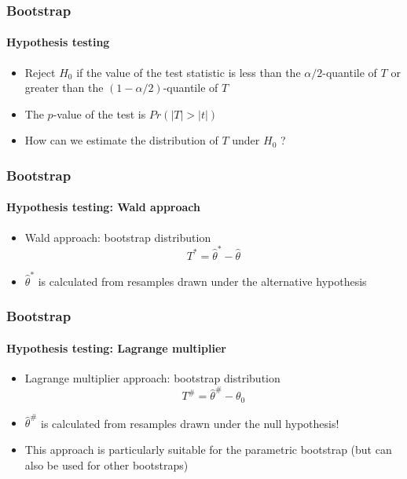 \documentclass[smaller,compress]{beamer}
\begin{document}
\begin{frame}\frametitle{Bootstrap}\framesubtitle{Hypothesis testing}
\begin{itemize}
    \item Reject $H_{0}$ if the value of the test statistic is less than the $\alpha /2$-quantile of $T$ or greater than the $\left( 1-\alpha /2\right) $-quantile of $T$
    \item The $p$-value of the test is $Pr(|T|>|t|)$
    \item How can we estimate the distribution of $T$ under $H_{0}$ ?
\end{itemize}
\end{frame}

\begin{frame}\frametitle{Bootstrap}\framesubtitle{Hypothesis testing: Wald approach}
\begin{itemize}
    \item Wald approach: bootstrap distribution
    \begin{equation*}
    T^{\ast }=\hat{\theta}^{\ast }-\hat{\theta}
    \end{equation*}
    \item $\hat{\theta}^{\ast }$ is calculated from resamples drawn under the alternative hypothesis
\end{itemize}
\end{frame}


\begin{frame}\frametitle{Bootstrap}\framesubtitle{Hypothesis testing: Lagrange multiplier}
\begin{itemize}
    \item Lagrange multiplier approach: bootstrap distribution
    \begin{equation*}
    T^{\#}=\hat{\theta}^{\#}-\theta _{0}
    \end{equation*}
    \item $\hat{\theta}^{\#}$ is calculated from resamples drawn under the null hypothesis!
    \item This approach is particularly suitable for the parametric bootstrap (but can also be used for other bootstraps)
\end{itemize}
\end{frame}
\end{document}

